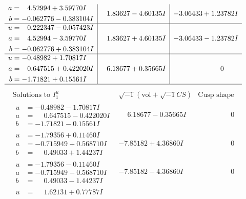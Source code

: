 \documentclass[1p]{elsarticle_modified}
\theoremstyle{definition}
\newcommand{\I}{\sqrt{-1}}
\begin{document}
$$\begin{array}{c|c|c}
\begin{aligned}
a &= \phantom{-}4.52994 + 3.59770 I \\
b &= -0.062776 - 0.383104 I\end{aligned}
 & \phantom{-}1.83627 - 4.60135 I & -3.06433 + 1.23782 I \\ \hline\begin{aligned}
u &= \phantom{-}0.222347 - 0.057423 I \\
a &= \phantom{-}4.52994 - 3.59770 I \\
b &= -0.062776 + 0.383104 I\end{aligned}
 & \phantom{-}1.83627 + 4.60135 I & -3.06433 - 1.23782 I \\ \hline\begin{aligned}
u &= -0.48982 + 1.70817 I \\
a &= \phantom{-}0.647515 + 0.422020 I \\
b &= -1.71821 + 0.15561 I\end{aligned}
 & \phantom{-}6.18677 + 0.35665 I & \phantom{-0.000000 } 0\\
 \hline 
 \end{array}$$\newpage$$\begin{array}{c|c|c}  
\text{Solutions to }I^u_{1}& \I (\text{vol} + \sqrt{-1}CS) & \text{Cusp shape}\\
 \hline 
\begin{aligned}
u &= -0.48982 - 1.70817 I \\
a &= \phantom{-}0.647515 - 0.422020 I \\
b &= -1.71821 - 0.15561 I\end{aligned}
 & \phantom{-}6.18677 - 0.35665 I & \phantom{-0.000000 } 0 \\ \hline\begin{aligned}
u &= -1.79356 + 0.11460 I \\
a &= -0.715949 + 0.568710 I \\
b &= \phantom{-}0.49033 + 1.44237 I\end{aligned}
 & -7.85182 + 4.36860 I & \phantom{-0.000000 } 0 \\ \hline\begin{aligned}
u &= -1.79356 - 0.11460 I \\
a &= -0.715949 - 0.568710 I \\
b &= \phantom{-}0.49033 - 1.44237 I\end{aligned}
 & -7.85182 - 4.36860 I & \phantom{-0.000000 } 0 \\ \hline\begin{aligned}
u &= \phantom{-}1.62131 + 0.77787 I \\

\end{aligned}
\end{array}$$
\end{document}
